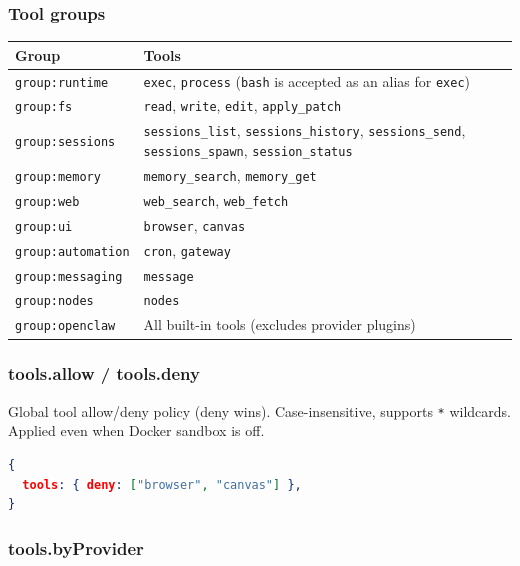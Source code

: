 \subsubsection{Tool groups}



\begin{table}[h]
\centering
\small
\begin{tabular}{|l|l|}
\hline
Group & Tools \\
\hline
\texttt{group:runtime} & \texttt{exec}, \texttt{process} (\texttt{bash} is accepted as an alias for \texttt{exec}) \\
\hline
\texttt{group:fs} & \texttt{read}, \texttt{write}, \texttt{edit}, \texttt{apply\_patch} \\
\hline
\texttt{group:sessions} & \texttt{sessions\_list}, \texttt{sessions\_history}, \texttt{sessions\_send}, \texttt{sessions\_spawn}, \texttt{session\_status} \\
\hline
\texttt{group:memory} & \texttt{memory\_search}, \texttt{memory\_get} \\
\hline
\texttt{group:web} & \texttt{web\_search}, \texttt{web\_fetch} \\
\hline
\texttt{group:ui} & \texttt{browser}, \texttt{canvas} \\
\hline
\texttt{group:automation} & \texttt{cron}, \texttt{gateway} \\
\hline
\texttt{group:messaging} & \texttt{message} \\
\hline
\texttt{group:nodes} & \texttt{nodes} \\
\hline
\texttt{group:openclaw} & All built-in tools (excludes provider plugins) \\
\hline
\end{tabular}
\end{table}



\subsubsection{tools.allow / tools.deny}


Global tool allow/deny policy (deny wins). Case-insensitive, supports \texttt{*} wildcards. Applied even when Docker sandbox is off.

\begin{lstlisting}[language=json]
{
  tools: { deny: ["browser", "canvas"] },
}
\end{lstlisting}


\subsubsection{tools.byProvider}


